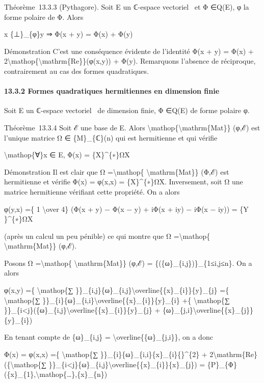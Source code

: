 \documentclass[]{article}
\begin{document}
Théorème~13.3.3 (Pythagore). Soit E un ℂ-espace vectoriel ~et Φ ∈Q(E), φ
la forme polaire de Φ. Alors

x \{⊥\}\_\{φ\}y ⇒ Φ(x + y) = Φ(x) + Φ(y)

Démonstration C'est une conséquence évidente de l'identité Φ(x + y) =
Φ(x) + 2\textbackslash{}mathop\{\textbackslash{}mathrm\{Re\}\}(φ(x,y)) +
Φ(y). Remarquons l'absence de réciproque, contrairement au cas des
formes quadratiques.

\paragraph{13.3.2 Formes quadratiques hermitiennes en dimension finie}

Soit E un ℂ-espace vectoriel ~de dimension finie, Φ ∈Q(E) de forme
polaire φ.

Théorème~13.3.4 Soit ℰ une base de E. Alors
\textbackslash{}mathop\{\textbackslash{}mathrm\{Mat\}\} (φ,ℰ) est
l'unique matrice Ω ∈ \{M\}\_\{ℂ\}(n) qui est hermitienne et qui vérifie

\textbackslash{}mathop\{∀\}x ∈ E, Φ(x) = \{X\}\^{}\{∗\}ΩX

Démonstration Il est clair que Ω =\textbackslash{}mathop\{
\textbackslash{}mathrm\{Mat\}\} (Φ,ℰ) est hermitienne et vérifie Φ(x) =
φ(x,x) = \{X\}\^{}\{∗\}ΩX. Inversement, soit Ω une matrice hermitienne
vérifiant cette propriété. On a alors

φ(y,x) =\{ 1 \textbackslash{}over 4\} (Φ(x + y) − Φ(x − y) + iΦ(x + iy)
− iΦ(x − iy)) = \{Y \}\^{}\{∗\}ΩX

(après un calcul un peu pénible) ce qui montre que Ω
=\textbackslash{}mathop\{ \textbackslash{}mathrm\{Mat\}\} (φ,ℰ).

Posons Ω =\textbackslash{}mathop\{ \textbackslash{}mathrm\{Mat\}\} (φ,ℰ)
= \{(\{ω\}\_\{i,j\})\}\_\{1≤i,j≤n\}. On a alors

φ(x,y) =\{ \textbackslash{}mathop\{∑
\}\}\_\{i,j\}\{ω\}\_\{i,j\}\textbackslash{}overline\{\{x\}\_\{i\}\}\{y\}\_\{j\}
=\{ \textbackslash{}mathop\{∑
\}\}\_\{i\}\{ω\}\_\{i,i\}\textbackslash{}overline\{\{x\}\_\{i\}\}\{y\}\_\{i\}
+\{ \textbackslash{}mathop\{∑
\}\}\_\{i\textless{}j\}(\{ω\}\_\{i,j\}\textbackslash{}overline\{\{x\}\_\{i\}\}\{y\}\_\{j\}
+ \{ω\}\_\{j,i\}\textbackslash{}overline\{\{x\}\_\{j\}\}\{y\}\_\{i\})

En tenant compte de \{ω\}\_\{i,j\} =
\textbackslash{}overline\{\{ω\}\_\{j,i\}\}, on a donc

Φ(x) = φ(x,x) =\{ \textbackslash{}mathop\{∑
\}\}\_\{i\}\{ω\}\_\{i,i\}\textbar{}\{x\}\_\{i\}\{\textbar{}\}\^{}\{2\} +
2\textbackslash{}mathrm\{Re\}(\{\textbackslash{}mathop\{∑
\}\}\_\{i\textless{}j\}\{ω\}\_\{i,j\}\textbackslash{}overline\{\{x\}\_\{i\}\}\{x\}\_\{j\})
=
\{P\}\_\{Φ\}(\{x\}\_\{1\},\textbackslash{}mathop\{\ldots{}\},\{x\}\_\{n\})
\end{document}
